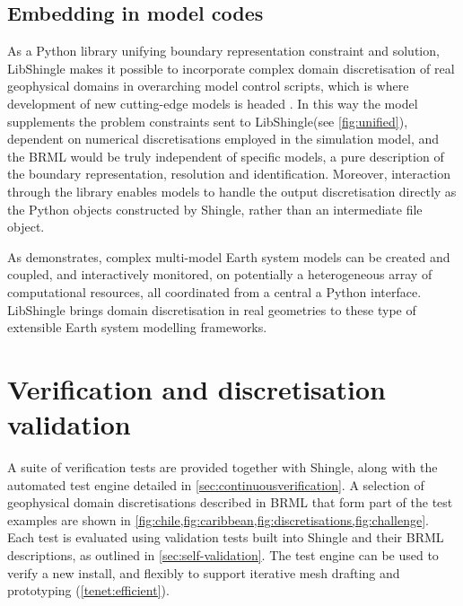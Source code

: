 \documentclass[a4paper, 10pt]{book}
\providecommand{\shingle}{Shingle\xspace}
\providecommand{\libshingle}{LibShingle\xspace}
\providecommand{\brml}{BRML\xspace}
\providecommand{\brep}{boundary representation\xspace}
\begin{document}
\section{Embedding in model codes}
%
%
As a Python library unifying \brep constraint and solution, \libshingle makes it possible to incorporate complex domain discretisation of real geophysical domains in overarching model control scripts, which is where development of new cutting-edge models is headed
\citep[see for example,][]{firedrake,omuse}.
%
In this way the model supplements the problem constraints sent to \libshingle (see \cref{fig:unified}),
dependent on numerical discretisations employed
in the simulation model, and
the \brml would be truly independent of specific models, a pure description of the boundary representation, resolution and identification.
%
Moreover, interaction through the library enables models to
handle the output discretisation directly as the Python objects constructed by \shingle, rather than an intermediate file object.

As \cite{omuse} demonstrates, complex multi-model Earth system models can be created and coupled, and interactively monitored,
on potentially a heterogeneous array of computational resources,
all coordinated from a central a Python interface.
%
\libshingle brings domain discretisation in real geometries to these type of extensible Earth system modelling frameworks.






\chapter{Verification and discretisation validation}
\label{sec:verification}
%
%
A suite of verification tests are provided together with \shingle, along with the automated test engine detailed in
\cref{sec:continuousverification}.
%
A selection of geophysical domain discretisations
described in \brml that form part of the test examples
are shown in \cref{fig:chile,fig:caribbean,fig:discretisations,fig:challenge}.
%
Each test is evaluated using validation tests built into \shingle and their \brml descriptions, as outlined in
\cref{sec:self-validation}.
%
The test engine can be used to verify a new install, and flexibly to support iterative mesh drafting and prototyping (\cref{tenet:efficient}).
%
\end{document}
